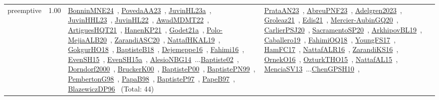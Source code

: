 {\begin{longtable}{p{3cm}r>{\raggedright\arraybackslash}p{6cm}>{\raggedright\arraybackslash}p{6cm}>{\raggedright\arraybackslash}p{8cm}}
\index{preemptive}\index{Concepts!preemptive}preemptive &  1.00 & \href{../works/BonninMNE24.pdf}{BonninMNE24}~\cite{BonninMNE24}, \href{../works/PovedaAA23.pdf}{PovedaAA23}~\cite{PovedaAA23}, \href{../works/JuvinHL23a.pdf}{JuvinHL23a}~\cite{JuvinHL23a}, \href{../works/JuvinHHL23.pdf}{JuvinHHL23}~\cite{JuvinHHL23}, \href{../works/JuvinHL22.pdf}{JuvinHL22}~\cite{JuvinHL22}, \href{../works/AwadMDMT22.pdf}{AwadMDMT22}~\cite{AwadMDMT22}, \href{../works/ArtiguesHQT21.pdf}{ArtiguesHQT21}~\cite{ArtiguesHQT21}, \href{../works/HanenKP21.pdf}{HanenKP21}~\cite{HanenKP21}, \href{../works/Godet21a.pdf}{Godet21a}~\cite{Godet21a}, \href{../works/Polo-MejiaALB20.pdf}{Polo-MejiaALB20}~\cite{Polo-MejiaALB20}, \href{../works/ZarandiASC20.pdf}{ZarandiASC20}~\cite{ZarandiASC20}, \href{../works/NattafHKAL19.pdf}{NattafHKAL19}~\cite{NattafHKAL19}, \href{../works/GokgurHO18.pdf}{GokgurHO18}~\cite{GokgurHO18}, \href{../works/BaptisteB18.pdf}{BaptisteB18}~\cite{BaptisteB18}, \href{../works/Dejemeppe16.pdf}{Dejemeppe16}~\cite{Dejemeppe16}, \href{../works/Fahimi16.pdf}{Fahimi16}~\cite{Fahimi16}, \href{../works/EvenSH15.pdf}{EvenSH15}~\cite{EvenSH15}, \href{../works/EvenSH15a.pdf}{EvenSH15a}~\cite{EvenSH15a}, \href{../works/AlesioNBG14.pdf}{AlesioNBG14}~\cite{AlesioNBG14}...\href{../works/Baptiste02.pdf}{Baptiste02}~\cite{Baptiste02}, \href{../works/Dorndorf2000.pdf}{Dorndorf2000}~\cite{Dorndorf2000}, \href{../works/BruckerK00.pdf}{BruckerK00}~\cite{BruckerK00}, \href{../works/BaptisteP00.pdf}{BaptisteP00}~\cite{BaptisteP00}, \href{../works/BaptistePN99.pdf}{BaptistePN99}~\cite{BaptistePN99}, \href{../works/PembertonG98.pdf}{PembertonG98}~\cite{PembertonG98}, \href{../works/PapaB98.pdf}{PapaB98}~\cite{PapaB98}, \href{../works/BaptisteP97.pdf}{BaptisteP97}~\cite{BaptisteP97}, \href{../works/PapeB97.pdf}{PapeB97}~\cite{PapeB97}, \href{../works/BlazewiczDP96.pdf}{BlazewiczDP96}~\cite{BlazewiczDP96} (Total: 44) & \href{../works/PrataAN23.pdf}{PrataAN23}~\cite{PrataAN23}, \href{../works/AbreuPNF23.pdf}{AbreuPNF23}~\cite{AbreuPNF23}, \href{../works/Adelgren2023.pdf}{Adelgren2023}~\cite{Adelgren2023}, \href{../works/Groleaz21.pdf}{Groleaz21}~\cite{Groleaz21}, \href{../works/Edis21.pdf}{Edis21}~\cite{Edis21}, \href{../works/Mercier-AubinGQ20.pdf}{Mercier-AubinGQ20}~\cite{Mercier-AubinGQ20}, \href{../works/CarlierPSJ20.pdf}{CarlierPSJ20}~\cite{CarlierPSJ20}, \href{../works/SacramentoSP20.pdf}{SacramentoSP20}~\cite{SacramentoSP20}, \href{../works/ArkhipovBL19.pdf}{ArkhipovBL19}~\cite{ArkhipovBL19}, \href{../works/Caballero19.pdf}{Caballero19}~\cite{Caballero19}, \href{../works/FahimiOQ18.pdf}{FahimiOQ18}~\cite{FahimiOQ18}, \href{../works/YoungFS17.pdf}{YoungFS17}~\cite{YoungFS17}, \href{../works/HamFC17.pdf}{HamFC17}~\cite{HamFC17}, \href{../works/NattafALR16.pdf}{NattafALR16}~\cite{NattafALR16}, \href{../works/ZarandiKS16.pdf}{ZarandiKS16}~\cite{ZarandiKS16}, \href{../works/OrnekO16.pdf}{OrnekO16}~\cite{OrnekO16}, \href{../works/OzturkTHO15.pdf}{OzturkTHO15}~\cite{OzturkTHO15}, \href{../works/NattafAL15.pdf}{NattafAL15}~\cite{NattafAL15}, \href{../works/MenciaSV13.pdf}{MenciaSV13}~\cite{MenciaSV13}...\href{../works/ChenGPSH10.pdf}{ChenGPSH10}~\cite{ChenGPSH10}, 
\end{longtable}}
